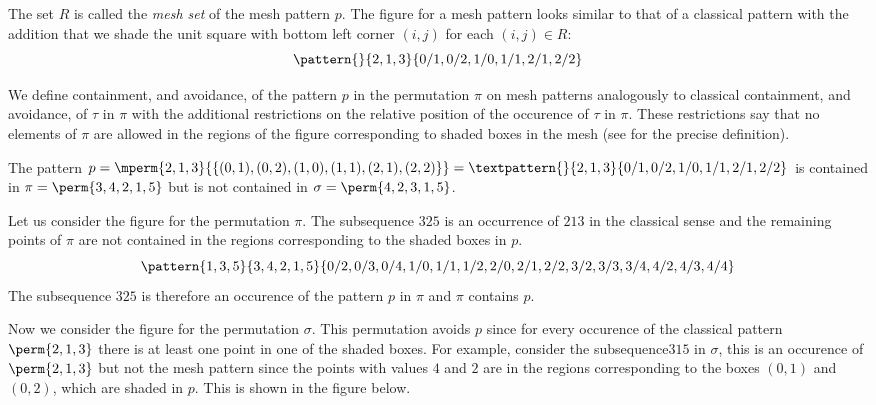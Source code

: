 The set \(R\) is called the \emph{mesh set} of the mesh pattern \(p\).
The figure for a mesh pattern looks similar to that of a classical pattern with the
addition that we shade the unit square with bottom left corner \((i,j)\) for each \((i,j) \in R\):
\begin{equation*}
    \pattern{}{ 2, 1, 3 }{ 0/1, 0/2, 1/0, 1/1, 2/1, 2/2 }
\end{equation*}

We define containment, and avoidance, of the pattern \(p\) in the permutation
\(\pi\) on mesh patterns analogously to classical containment, and avoidance,
of \(\tau\) in \(\pi\) with the additional restrictions on the relative
position of the occurence of \(\tau\) in \(\pi\). These restrictions say that
no elements of \(\pi\) are allowed in the regions of the figure corresponding
to shaded boxes in the mesh (see \cite[2]{journals/combinatorics/BrandenC11}
for the precise definition).

\begin{example}
    The pattern \(p=\mperm{2,1,3}{\{(0,1),(0,2),(1,0),(1,1),(2,1),(2,2)\}}=
    \textpattern{}{ 2, 1, 3 }{ 0/1, 0/2, 1/0, 1/1, 2/1, 2/2 }\) is contained in
    \(\pi = \perm{3,4,2,1,5}\) but is not contained in \(\sigma = \perm{4,2,3,1,5}\).
\end{example}

Let us consider the figure for the permutation \(\pi\). The subsequence \(325\) is
an occurrence of \(213\) in the classical sense and the remaining points of \(\pi\)
are not contained in the regions corresponding to the shaded boxes in \(p\).
\begin{equation*}
    \pattern{1,3,5}{3,4,2,1,5}{0/2,0/3,0/4,
                               1/0,1/1,1/2,
                               2/0,2/1,2/2,
                               3/2,3/3,3/4,
                               4/2,4/3,4/4}
\end{equation*}
The subsequence \(325\) is therefore an occurence of the pattern \(p\) in \(\pi\) and
\(\pi\) contains \(p\).

Now we consider the figure for the permutation \(\sigma\). This permutation
avoids \(p\) since for every occurence of the classical pattern \(\perm{2,1,3}\)
there is at least one point in one of the shaded boxes. For example, consider the
subsequence\(315\) in \(\sigma\), this is an occurence of \(\perm{2,1,3}\) but
not the mesh pattern since the points with values \(4\) and \(2\) are in the
regions corresponding to the boxes \((0,1)\) and \((0,2)\), which are shaded in
\(p\). This is shown in the figure below.

